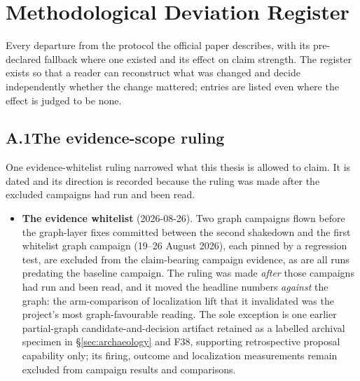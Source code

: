 \chapter{Methodological Deviation Register}
\label{app:deviations}

Every departure from the protocol the official paper describes, with its
pre-declared fallback where one existed and its effect on claim strength.
The register exists so that a reader can reconstruct what was changed and
decide independently whether the change mattered; entries are listed even
where the effect is judged to be none.

\section*{A.1\quad The evidence-scope ruling}

One evidence-whitelist ruling narrowed what this thesis is allowed to claim.
It is dated and its direction is recorded because the ruling was made after
the excluded campaigns had run and been read.

\begin{itemize}
  \item \textbf{The evidence whitelist} (2026-08-26). Two graph campaigns
        flown before the graph-layer fixes committed between the second
        shakedown and the first whitelist graph campaign (19--26 August
        2026), each pinned by a regression test, are excluded from the claim-bearing campaign evidence, as are all runs
        predating the baseline campaign. The ruling was made
        \emph{after} those campaigns had run and been read, and it moved the
        headline numbers \emph{against} the graph: the arm-comparison of
        localization lift that it invalidated was the project's most
        graph-favourable reading. The sole exception is one earlier partial-graph
        candidate-and-decision artifact retained as a labelled archival specimen
        in \S\ref{sec:archaeology} and F38, supporting retrospective proposal
        capability only; its firing, outcome and localization measurements remain
        excluded from campaign results and comparisons.
\end{itemize}

